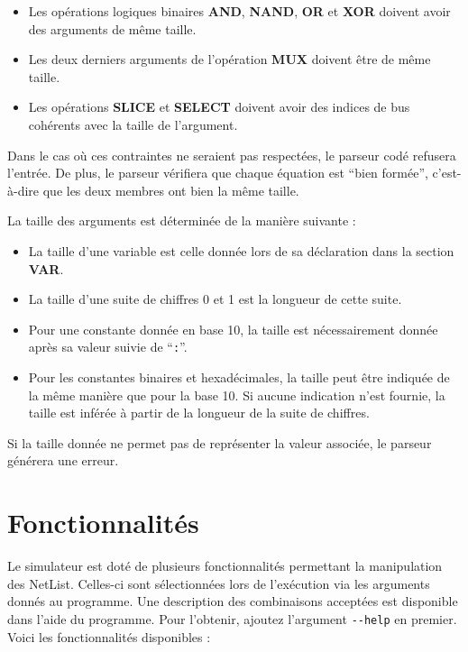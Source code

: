 \documentclass[french, 12pt]{article}
\begin{document}
\begin{itemize}
      \item Les opérations logiques binaires \textbf{AND}, \textbf{NAND},
            \textbf{OR} et \textbf{XOR} doivent avoir des arguments de même taille.
      \item Les deux derniers arguments de l'opération \textbf{MUX} doivent être
            de même taille.
      \item Les opérations \textbf{SLICE} et \textbf{SELECT} doivent avoir des
            indices de bus cohérents avec la taille de l'argument.
\end{itemize}


Dans le cas où ces contraintes ne seraient pas respectées, le parseur codé refusera l'entrée.
De plus, le parseur vérifiera que chaque équation est ``bien formée'', c'est-à-dire que les deux membres ont bien la même taille.


La taille des arguments est déterminée de la manière suivante :

\begin{itemize}
      \item La taille d'une variable est celle donnée lors de sa
            déclaration dans la section \textbf{VAR}.
      \item La taille d'une suite de chiffres 0 et 1 est la longueur de cette
            suite.
      \item Pour une constante donnée en base 10, la taille est nécessairement
            donnée après sa valeur suivie de ``\verb|:|''.
      \item Pour les constantes binaires et hexadécimales, la taille peut être
            indiquée de la même manière que pour la base 10. Si aucune indication
            n'est fournie, la taille est inférée à partir de la longueur de la
            suite de chiffres.
\end{itemize}


Si la taille donnée ne permet pas de représenter la valeur associée, le
parseur générera une erreur.


\section {Fonctionnalités}


Le simulateur est doté de plusieurs fonctionnalités permettant la manipulation des NetList.
Celles-ci sont sélectionnées lors de l'exécution via les arguments donnés au programme.
Une description des combinaisons acceptées est disponible dans l'aide du programme.
Pour l'obtenir, ajoutez l'argument \verb|--help| en premier.
Voici les fonctionnalités disponibles :
\end{document}
